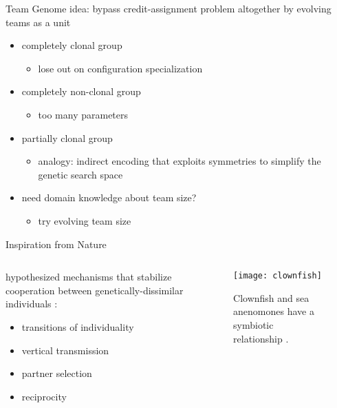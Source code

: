 \begin{frame}{Team Genome}
idea: bypass credit-assignment problem altogether by evolving teams as a unit

\begin{itemize}
\item completely clonal group
\begin{itemize}
\item lose out on configuration specialization
\end{itemize}
\item completely non-clonal group
\begin{itemize}
\item too many parameters
\end{itemize}
\item partially clonal group \cite{bongard2000legion}
\begin{itemize}
\item analogy: indirect encoding that exploits symmetries to simplify the genetic search space \cite{bongard2000legion}
\end{itemize}
\item need domain knowledge about team size?
\begin{itemize}
\item try evolving team size \cite{bongard2000legion}
\end{itemize}

\end{itemize}

\end{frame}

\begin{frame}{Inspiration from Nature}

\begin{columns}
\begin{column}{0.5\textwidth}
hypothesized mechanisms that stabilize cooperation between genetically-dissimilar individuals \cite{vostinar2017suicide, andre2016evolutionary}:
\begin{itemize}
\item transitions of individuality
\item vertical transmission
\item partner selection
\item reciprocity
\end{itemize}
\end{column}
\begin{column}{0.5\textwidth}
\begin{figure}
\texttt{[image: clownfish]}
\caption{
Clownfish and sea anenomones have a symbiotic relationship \cite{dunn1981clownfish}.
}
\label{fig:clownfish}
\end{figure}
\end{column}
\end{columns}
\end{frame}
